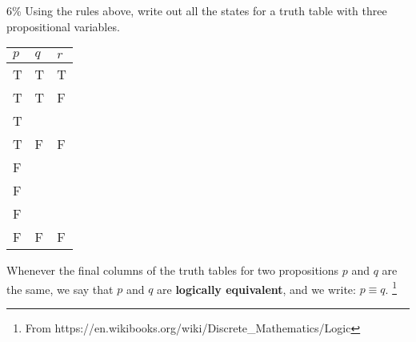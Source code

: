 \documentclass[a4paper,12pt]{book}
\begin{document}
        \begin{question}{5}{6\%}
            Using the rules above, write out all the states for a
            truth table with three propositional variables. ~\\
        \end{question}

        \begin{tabular}{ | p{2cm} | p{2cm} | p{2cm} | }
            \hline
            $p$ & $q$ & $r$   \\ \hline
            T & T & T         \\ \hline
            T & T & F         \\ \hline
            T &  &          \\ \hline
            T & F & F         \\ \hline
            F &  &          \\ \hline
            F &  &          \\ \hline
            F &  &          \\ \hline
            F & F & F         \\ \hline
        \end{tabular}

        \newpage

        \begin{introNOHEAD}
            Whenever the final columns of the truth tables for two propositions $p$ and $q$ are the same,
            we say that $p$ and $q$ are \textbf{logically equivalent}, and we write: $p \equiv q$.
            \footnote{From https://en.wikibooks.org/wiki/Discrete\_Mathematics/Logic}
        \end{introNOHEAD}
\end{document}
